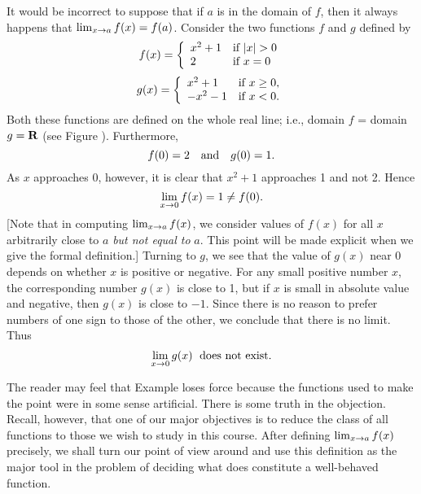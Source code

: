 \begin{example}\label{exam 1.4.3}
It would be incorrect to suppose that
if $a$ is in the domain of $f$,
then it always happens that
$\lim_{x \rightarrow a}f(x) = f(a)$.
Consider the two functions $f$ and $g$ defined by 
\[
f(x) =
\left\{ \begin{array}{ll} x^2+1 & \mbox{if $|x| > 0$} \\ 2 & \mbox{if $x = 0$} \end{array} \right.
\]
\[
g(x) =
\left\{ \begin{array}{ll} x^2 + 1    &  \mbox{if $x \geq 0$}, \\ -x^2 -1    &  \mbox{if $x < 0$}. \end{array} \right.
\]
Both these functions are defined on the whole real line;
i.e., domain $f$ = domain $g = \mathrm{\bf R}$
(see Figure ).
Furthermore,
\[
f(0) = 2
\quad \mbox{and} \quad
g(0) = 1.
\]
As $x$ approaches 0, however,
it is clear that $x^2 + 1$ approaches 1 and not 2.
Hence 
\[
\lim_{x \rightarrow 0}f(x) = 1 \neq f(0).
\]
[Note that in computing $\lim_{x \rightarrow a}f(x)$,
we consider values of $f(x)$
for all $x$  arbitrarily close to $a$
\emph{but not equal to} $a$.
This point will be made explicit
when we give the formal definition.]
Turning to $g$,
we see that the value of $g(x)$ near 0
depends on whether $x$ is positive or negative.
For any small positive number $x$,
the corresponding number $g(x)$ is close to  1,
but if $x$ is small in absolute value and negative,
then $g(x)$ is close to $-1$.
Since there is no reason to prefer numbers of one sign to those of the other,
we conclude that there is no limit.
Thus
\[
\lim_{x \rightarrow 0} g(x) \; \mbox{ does not exist}. 
\]
\end{example}

The reader may feel that Example 
loses force because the functions used to make the point
were in some sense artificial.
There is some truth in the objection.
Recall, however,
that one of our major objectives
is to reduce the class of all functions
to those we wish to study in this course.
After defining
$\lim_{x \rightarrow a}f(x)$ precisely,
we shall turn our point of view around
and use this definition as the major tool
in the problem of deciding what does constitute a well-behaved function.

